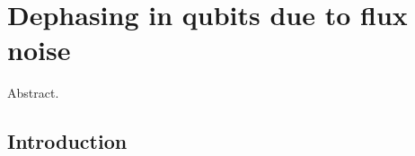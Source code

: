 \chapter{Dephasing in qubits due to flux noise }
\label{chap.dephasing}

Abstract.

\section{Introduction}


